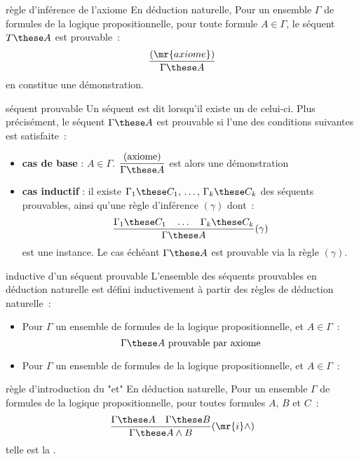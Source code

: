 \begin{adjustwidth}{-3cm}{-3cm}
\begin{definition}{7.5}{règle d'inférence de l'axiome}
    En déduction naturelle, Pour un ensemble $\Gamma$ de formules de la logique propositionnelle, pour toute formule $A \in \Gamma$, le séquent $T \these A$ est prouvable~:
    $$\frac{(\mr{axiome})}{\Gamma \these A}$$
    en constitue une démonstration.
\end{definition}

\begin{definition}{7.6}{séquent prouvable}
    Un séquent est dit  lorsqu'il existe un  de celui-ci. Plus précisément, le séquent $\Gamma \these A$ est prouvable si l'une des conditions suivantes est satisfaite~:
    \begin{itemize}
        \item \textbf{cas de base} : $A \in \Gamma$. $\displaystyle \frac{(\text{axiome})}{\Gamma \these A}$ est alors une démonstration
        \item \textbf{cas inductif} : il existe $\Gamma_1 \these C_1,\, \dots,\,  \Gamma_k \these C_k$ des séquents prouvables, ainsi qu'une règle d'inférence $(\gamma)$ dont~:
        $$\frac{\Gamma_1 \these C_1 \quad \dots \quad \Gamma_k \these C_k}{\Gamma \these A}(\gamma)$$
        est une instance. Le cas échéant $\Gamma \these A$ est prouvable via la règle $(\gamma)$.
    \end{itemize}
\end{definition}

\begin{definition}{7.7}{inductive d'un séquent prouvable}
    L'ensemble des séquents prouvables en déduction naturelle est défini inductivement à partir des règles de déduction naturelle~:
    \begin{itemize}
        \item Pour $\Gamma$ un ensemble de formules de la logique propositionnelle, et $A \in \Gamma$~:
        $$\Gamma \these A \text{ prouvable par axiome}$$
        \item Pour $\Gamma$ un ensemble de formules de la logique propositionnelle, et $A \in \Gamma$~:

    \end{itemize}
\end{definition}

\begin{definition}{7.8}{règle d'introduction du "et"}
    En déduction naturelle, Pour un ensemble $\Gamma$ de formules de la logique propositionnelle, pour toutes formules $A$, $B$ et $C$~:
    $$\frac{\Gamma \these A \quad \Gamma \these B}{\Gamma \these A \wedge B}(\mr{i}\wedge)$$
    telle est la .
\end{definition}


\end{adjustwidth}
